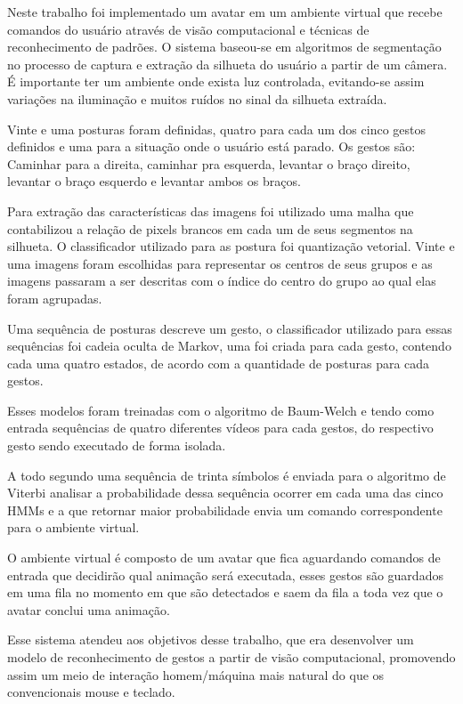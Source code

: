 
Neste trabalho foi implementado um avatar em um ambiente virtual que recebe comandos do usuário através de visão computacional e técnicas de reconhecimento de padrões. O sistema baseou-se em algoritmos de segmentação no processo de captura e extração da silhueta do usuário a partir de um câmera. É importante ter um ambiente onde exista luz controlada, evitando-se assim variações na iluminação e muitos ruídos no sinal da silhueta extraída.

Vinte e uma posturas foram definidas, quatro para cada um dos cinco gestos definidos e uma para a situação onde o usuário está parado. Os gestos são: Caminhar para a direita, caminhar pra esquerda, levantar o braço direito, levantar o braço esquerdo e levantar ambos os braços.

Para extração das características das imagens foi utilizado uma malha que contabilizou a relação de pixels brancos em cada um de seus segmentos na silhueta. O classificador utilizado para as postura foi quantização vetorial. Vinte e uma imagens foram escolhidas para representar os centros de seus grupos e as imagens passaram a ser descritas com o índice do centro do grupo ao qual elas foram agrupadas.

Uma sequência de posturas descreve um gesto, o classificador utilizado para essas sequências foi cadeia oculta de Markov, uma foi criada para cada gesto, contendo cada uma quatro estados, de acordo com a quantidade de posturas para cada gestos.

Esses modelos foram treinadas com o algoritmo de Baum-Welch e tendo como entrada sequências de quatro diferentes vídeos para cada gestos, do respectivo gesto sendo executado de forma isolada.

A todo segundo uma sequência de trinta símbolos é enviada para o algoritmo de Viterbi analisar a probabilidade dessa sequência ocorrer em cada uma das cinco HMMs e a que retornar maior probabilidade envia um comando correspondente para o ambiente virtual.

O ambiente virtual é composto de um avatar que fica aguardando comandos de entrada que decidirão qual animação será executada, esses gestos são guardados em uma fila no momento em que são detectados e saem da fila a toda vez que o avatar conclui uma animação.

Esse sistema atendeu aos objetivos desse trabalho, que era desenvolver um modelo de reconhecimento de gestos a partir de visão computacional, promovendo assim um meio de interação homem/máquina mais natural do que os convencionais mouse e teclado.


